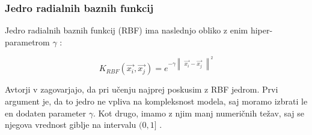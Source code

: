 \subsubsection{Jedro radialnih baznih funkcij}{
Jedro radialnih baznih funkcij (RBF) ima naslednjo obliko z enim hiper-parametrom $\gamma$ \cite{hsu2003practical}:

\begin{equation} \label{eq:rbf-kernel}
		K_{RBF}(\vec{x_i}, \vec{x_j}) = e^{
        	-\gamma 
        	\begin{Vmatrix}
        		\vec{x_i} - \vec{x_j}
        	\end{Vmatrix}^2
        }
\end{equation}

Avtorji v \cite{hsu2003practical} zagovarjajo, da pri učenju najprej poskusim z RBF jedrom. Prvi argument je, da to jedro ne vpliva na kompleksnost modela, saj moramo izbrati le en dodaten parameter $\gamma$. Kot drugo, imamo z njim manj numeričnih težav, saj se njegova vrednost giblje na intervalu $(0, 1]$ \cite{hsu2003practical}. 


\begin{comment}
\subsubsection{Jedro preseka generaliziranih histogramov}\label{sec:ghi}
Jedro preseka generaliziranih histogramov (GHI) je uporaben, ko imamo deskriptorje definirane kot histograme. Določen z enačbo \eqref{eq:ghi-kernel}, kjer je hiper-parameter $\beta \geq 0$, $m$ pa je število stolpcev histogramov $\vec{x}$ in $\vec{x}'$ \cite{boughorbel2005generalized}.

\begin{equation}\label{eq:ghi-kernel}
K_{GHI}(\vec{x}, \vec{x}') = \sum_{i=1}^m min\left\{ \left| x_i \right|^\beta, \left|  x_i' \right| \right\}
\end{equation}

Po \cite{boughorbel2005generalized} je prednost uporabe GHI jedra ta, da so meje invariantne na skaliranje prostora značilk, zato ne potrebujemo dodatne optimizacije skalirnega hiper-parametra. Optimalna vrednosti hiper-parametra je okoli $\beta=0.25$.

\end{comment}





}
